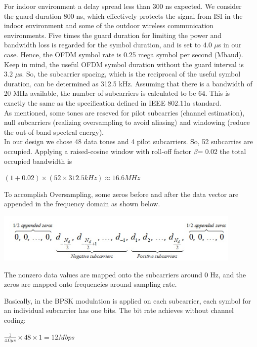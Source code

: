 For indoor environment a delay spread less than 300 ns expected. We consider the guard duration 800 ns, which effectively protects the signal from ISI in the indoor environment and some of the outdoor wireless communication environments. Five times the guard duration for limiting the power and bandwidth loss is regarded for the symbol duration, and is set to 4.0 $\mu$s in our case. Hence, the OFDM symbol rate is 0.25 mega symbol per second (Mbaud).\\
Keep in mind, the useful OFDM symbol duration without the guard interval is 3.2 $\mu$s. So, the subcarrier spacing, which is the reciprocal of the useful symbol duration, can be determined as 312.5 kHz. Assuming that there is a bandwidth of 20 MHz available, the number of subcarriers is calculated to be 64. This is exactly the same as the specification defined in IEEE 802.11a standard.\\
As mentioned, some tones are reseved for pilot subcarries (channel estimation), null subcarriers (realizing oversampling to avoid aliasing) and windowing (reduce the out-of-band spectral energy).\\
In our design we chose 48 data tones and 4 pilot subcarriers. So, 52 subcarries are occupied. Applying a raised-cosine window with roll-off factor $\beta$= 0.02 the total occupied bandwidth is\\
\begin{center}
$(1+ 0.02)\times(52 \times 312.5kHz) \approx 16.6MHz$
\end{center}

To accomplish Oversampling, some zeros before and after the data vector are appended in the frequency domain as shown below.\\

\begin{center}
\includegraphics[width=12cm]{content/fig/oversample.JPG}
\end{center}

The nonzero data values are mapped onto the subcarriers around 0 Hz, and the zeros are mapped onto frequencies around sampling rate.

Basically, in the BPSK modulation is applied on each subcarrier, each symbol for an
individual subcarrier has one bits. The bit rate achieves without channel coding:\\
\begin{center}
$\frac{1}{4.0\mu s} \times 48 \times 1= 12Mbps$
\end{center}

